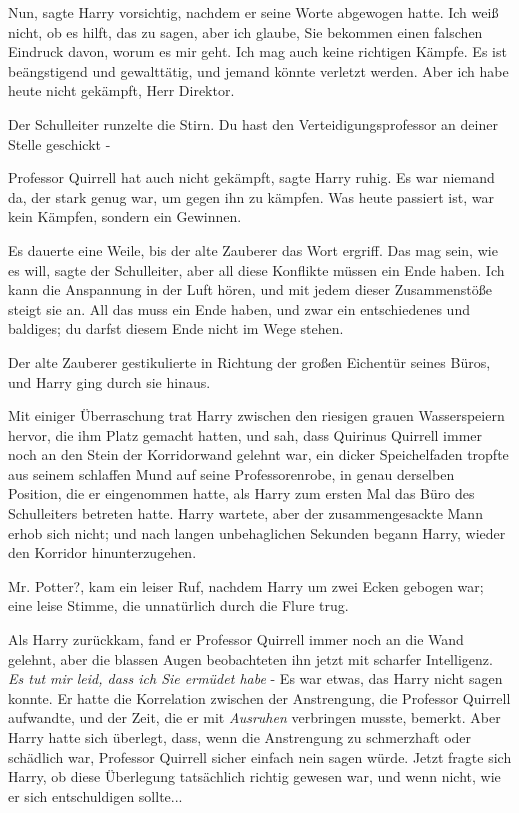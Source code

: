 \glqq Nun\grqq{}, sagte Harry vorsichtig, nachdem er seine Worte abgewogen
hatte. \glqq Ich weiß nicht, ob es hilft, das zu sagen, aber ich glaube, Sie
bekommen einen falschen Eindruck davon, worum es mir geht. Ich mag auch keine
richtigen Kämpfe. Es ist beängstigend und gewalttätig, und jemand könnte
verletzt werden. Aber ich habe heute nicht gekämpft, Herr Direktor.\grqq{}

Der Schulleiter runzelte die Stirn. \glqq Du hast den Verteidigungsprofessor an
deiner Stelle geschickt -\grqq{}

\glqq Professor Quirrell hat auch nicht gekämpft\grqq{}, sagte Harry ruhig.
\glqq Es war niemand da, der stark genug war, um gegen ihn zu kämpfen. Was heute
passiert ist, war kein Kämpfen, sondern ein Gewinnen.\grqq{}

Es dauerte eine Weile, bis der alte Zauberer das Wort ergriff. \glqq Das mag
sein, wie es will\grqq{}, sagte der Schulleiter, \glqq aber all diese Konflikte
müssen ein Ende haben. Ich kann die Anspannung in der Luft hören, und mit jedem
dieser Zusammenstöße steigt sie an. All das muss ein Ende haben, und zwar ein
entschiedenes und baldiges; du darfst diesem Ende nicht im Wege stehen.\grqq{}

Der alte Zauberer gestikulierte in Richtung der großen Eichentür seines Büros,
und Harry ging durch sie hinaus.

Mit einiger Überraschung trat Harry zwischen den riesigen grauen Wasserspeiern
hervor, die ihm Platz gemacht hatten, und sah, dass Quirinus Quirrell immer noch
an den Stein der Korridorwand gelehnt war, ein dicker Speichelfaden tropfte aus
seinem schlaffen Mund auf seine Professorenrobe, in genau derselben Position,
die er eingenommen hatte, als Harry zum ersten Mal das Büro des Schulleiters
betreten hatte. Harry wartete, aber der zusammengesackte Mann erhob sich nicht;
und nach langen unbehaglichen Sekunden begann Harry, wieder den Korridor
hinunterzugehen.

\glqq Mr. Potter?\grqq{}, kam ein leiser Ruf, nachdem Harry um zwei Ecken
gebogen war; eine leise Stimme, die unnatürlich durch die Flure trug.

Als Harry zurückkam, fand er Professor Quirrell immer noch an die Wand gelehnt,
aber die blassen Augen beobachteten ihn jetzt mit scharfer Intelligenz. \emph{Es
tut mir leid, dass ich Sie ermüdet habe} - Es war etwas, das Harry nicht sagen
konnte. Er hatte die Korrelation zwischen der Anstrengung, die Professor
Quirrell aufwandte, und der Zeit, die er mit \glqq \emph{Ausruhen}\grqq{}
verbringen musste, bemerkt. Aber Harry hatte sich überlegt, dass, wenn die
Anstrengung zu schmerzhaft oder schädlich war, Professor Quirrell sicher einfach
nein sagen würde. Jetzt fragte sich Harry, ob diese Überlegung tatsächlich
richtig gewesen war, und wenn nicht, wie er sich entschuldigen sollte...


